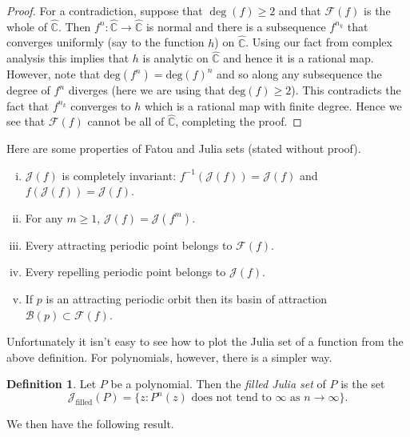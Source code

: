 \documentclass[12pt]{article}
\theoremstyle{definition}
\newtheorem{definition}[theorem]{Definition}
\theoremstyle{remark}
\begin{document}

\begin{proof}
For a contradiction, suppose that $\deg(f) \ge 2$ and that  $\mathcal{F}(f)$ is the whole of $\widehat{\mathbb{C}}$. Then $f^n : \widehat{\mathbb{C}} \to \widehat{\mathbb{C}}$ is normal and there is a subsequence $f^{n_k}$ that converges uniformly (say to the function $h$) on $\widehat{\mathbb{C}}$. Using our fact from complex analysis this implies that $h$ is analytic on $\widehat{\mathbb{C}}$ and
hence it is a rational map. However, note that $\text{deg}(f^n) = \text{deg}(f)^n$ and so along any subsequence the degree of $f^n$ diverges (here we are using that $\text{deg}(f) \ge 2$). This contradicts the fact that $f^{n_k}$ converges to  $h$ which is a rational map with finite degree. Hence we see that $\mathcal{F}(f)$ cannot be all of $\widehat{\mathbb{C}}$, completing the proof.
\end{proof}


Here are some properties of Fatou and Julia sets (stated without proof).
\begin{enumerate}[(i)]
\item $\mathcal{J}(f)$ is completely invariant: $f^{-1}(\mathcal{J}(f)) = \mathcal{J}(f)$ and $f(\mathcal{J}(f)) = \mathcal{J}(f)$.
\item For any $m \ge 1$, $\mathcal{J}(f) = \mathcal{J}(f^m)$.
\item Every attracting periodic point belongs to $\mathcal{F}(f)$.
\item Every repelling periodic point belongs to $\mathcal{J}(f)$.
\item If $p$ is an attracting periodic orbit then its basin of attraction $\mathcal{B}(p) \subset \mathcal{F}(f)$.
\end{enumerate}


Unfortunately it isn't easy to see how to plot the Julia set of a function from the above definition. For polynomials, however, there is a simpler way.

\begin{definition}
Let $P$ be a polynomial. Then the \emph{filled Julia set} of $P$ is the set
\[
\mathcal{J}_{\mathrm{filled}}(P) = \{ z : P^n(z) \text{ does not tend to $\infty$ as $n\to \infty$} \}.
\]
\end{definition}

We then have the following result.
\end{document}
